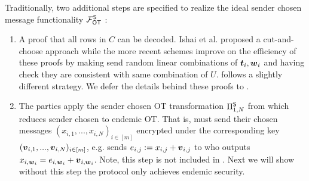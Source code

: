 Traditionally, two additional steps are specified to realize the ideal sender chosen message functionality $\mathcal{F}_{\mathsf{OT}}^\mathsf{S}$ \cite{C:IKNP03,C:KelOrsSch15,RSA:OrrOrsSch17,JC:ALSZ17}:
\begin{enumerate}

	\item A proof that all rows in $C$ can be decoded. Ishai et al. \cite{C:IKNP03} proposed a cut-and-choose approach while the more recent schemes \cite{C:KelOrsSch15,RSA:OrrOrsSch17} improve on the efficiency of these proofs by making \rec send random linear combinations of $\boldsymbol{t}_i,\boldsymbol{w}_i$ and having \send check they are consistent with same combination of $U$. \cite{RSA:OrrOrsSch17} follows a slightly different strategy.  We defer the details behind these proofs to \cite{C:KelOrsSch15,RSA:OrrOrsSch17,RSA:OrrOrsSch17}.
	
	\item The parties apply the sender chosen OT transformation $\Pi^{\mathsf{S}}_{1,N}$ from  which reduces sender chosen to endemic OT. That is, \send must send their chosen messages $(x_{i,1},...,x_{i,N})_{i\in [m]}$ encrypted under the corresponding key $(\boldsymbol{v}_{i,1},...,\boldsymbol{v}_{i,N})_{i\in [m]}$, e.g. \send sends $e_{i,j}:=x_{i,j}+\boldsymbol{v}_{i,j}$ to \rec who outputs $x_{i,\boldsymbol{w}_i}=e_{i,\boldsymbol{w}_i}+\boldsymbol{v}_{i,\boldsymbol{w}_i}$. Note, this step is not included in . Next we will show without this step the protocol only achieves endemic security.
\end{enumerate}




